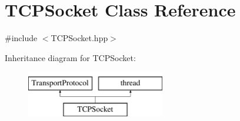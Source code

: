 \hypertarget{class_t_c_p_socket}{}\section{T\+C\+P\+Socket Class Reference}
\label{class_t_c_p_socket}


{\ttfamily \#include $<$T\+C\+P\+Socket.\+hpp$>$}

Inheritance diagram for T\+C\+P\+Socket\+:\begin{figure}[H]
\begin{center}
\leavevmode
\includegraphics[height=2.000000cm]{class_t_c_p_socket}
\end{center}
\end{figure}
